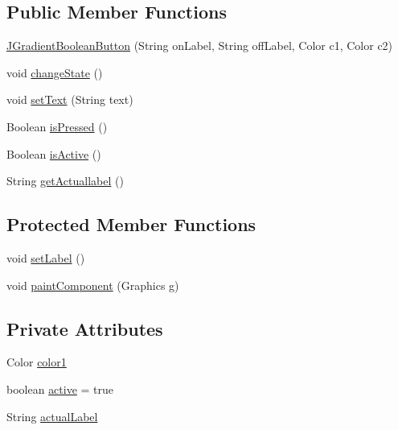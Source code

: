 \subsection*{Public Member Functions}
\begin{DoxyCompactItemize}
\item 
\hyperlink{classit_1_1emarolab_1_1cagg_1_1debugging_1_1baseComponents_1_1JGradientBooleanButton_af7ad84cd3ec73b492d69c482a0e81f01}{J\-Gradient\-Boolean\-Button} (String on\-Label, String off\-Label, Color c1, Color c2)
\item 
void \hyperlink{classit_1_1emarolab_1_1cagg_1_1debugging_1_1baseComponents_1_1JGradientBooleanButton_a2a823071faa9133cef4d45e060b17048}{change\-State} ()
\item 
void \hyperlink{classit_1_1emarolab_1_1cagg_1_1debugging_1_1baseComponents_1_1JGradientBooleanButton_a2468dcb90605b323f99b1204a046d47c}{set\-Text} (String text)
\item 
Boolean \hyperlink{classit_1_1emarolab_1_1cagg_1_1debugging_1_1baseComponents_1_1JGradientBooleanButton_a6457713f98a3a458473e81bc302a3846}{is\-Pressed} ()
\item 
Boolean \hyperlink{classit_1_1emarolab_1_1cagg_1_1debugging_1_1baseComponents_1_1JGradientBooleanButton_accc3a67fcd8a995a73cbbcd7e8c628ea}{is\-Active} ()
\item 
String \hyperlink{classit_1_1emarolab_1_1cagg_1_1debugging_1_1baseComponents_1_1JGradientBooleanButton_a78090745e867614ef20e979f10b8180d}{get\-Actuallabel} ()
\end{DoxyCompactItemize}
\subsection*{Protected Member Functions}
\begin{DoxyCompactItemize}
\item 
void \hyperlink{classit_1_1emarolab_1_1cagg_1_1debugging_1_1baseComponents_1_1JGradientBooleanButton_a5a5ddf11733e9fafa6d39f359f1fee8c}{set\-Label} ()
\item 
void \hyperlink{classit_1_1emarolab_1_1cagg_1_1debugging_1_1baseComponents_1_1JGradientBooleanButton_a53de1def3b1c0233c508de5f6d9c094e}{paint\-Component} (Graphics g)
\end{DoxyCompactItemize}
\subsection*{Private Attributes}
\begin{DoxyCompactItemize}
\item 
Color \hyperlink{classit_1_1emarolab_1_1cagg_1_1debugging_1_1baseComponents_1_1JGradientBooleanButton_a022be1289b6928205143a1e186e4ac69}{color1}
\item 
boolean \hyperlink{classit_1_1emarolab_1_1cagg_1_1debugging_1_1baseComponents_1_1JGradientBooleanButton_a61d46db41d1e95e7ec3e2762dcd06371}{active} = true
\item 
String \hyperlink{classit_1_1emarolab_1_1cagg_1_1debugging_1_1baseComponents_1_1JGradientBooleanButton_a56ffdb1625a967da01120d88e72328c8}{actual\-Label}
\end{DoxyCompactItemize}


